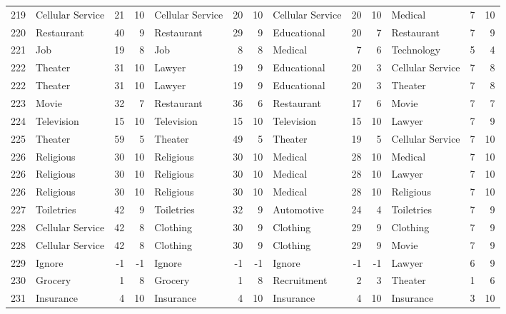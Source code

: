 \begin{figure}[htbp]
\begin{tabular}{rlrrlrrlrrlrr}
    219   & Cellular Service & 21    & 10    & Cellular Service & 20    & 10    & Cellular Service & 20    & 10    & Medical & 7     & 10 \\
    220   & Restaurant & 40    & 9     & Restaurant & 29    & 9     & Educational & 20    & 7     & Restaurant & 7     & 9 \\
    221   & Job   & 19    & 8     & Job   & 8     & 8     & Medical & 7     & 6     & Technology & 5     & 4 \\
    222   & Theater & 31    & 10    & Lawyer & 19    & 9     & Educational & 20    & 3     & Cellular Service & 7     & 8 \\
    222   & Theater & 31    & 10    & Lawyer & 19    & 9     & Educational & 20    & 3     & Theater & 7     & 8 \\
    223   & Movie & 32    & 7     & Restaurant & 36    & 6     & Restaurant & 17    & 6     & Movie & 7     & 7 \\
    224   & Television & 15    & 10    & Television & 15    & 10    & Television & 15    & 10    & Lawyer & 7     & 9 \\
    225   & Theater & 59    & 5     & Theater & 49    & 5     & Theater & 19    & 5     & Cellular Service & 7     & 10 \\
    226   & Religious & 30    & 10    & Religious & 30    & 10    & Medical & 28    & 10    & Medical & 7     & 10 \\
    226   & Religious & 30    & 10    & Religious & 30    & 10    & Medical & 28    & 10    & Lawyer & 7     & 10 \\
    226   & Religious & 30    & 10    & Religious & 30    & 10    & Medical & 28    & 10    & Religious & 7     & 10 \\
    227   & Toiletries & 42    & 9     & Toiletries & 32    & 9     & Automotive & 24    & 4     & Toiletries & 7     & 9 \\
    228   & Cellular Service & 42    & 8     & Clothing & 30    & 9     & Clothing & 29    & 9     & Clothing & 7     & 9 \\
    228   & Cellular Service & 42    & 8     & Clothing & 30    & 9     & Clothing & 29    & 9     & Movie & 7     & 9 \\
    229   & Ignore & -1    & -1    & Ignore & -1    & -1    & Ignore & -1    & -1    & Lawyer & 6     & 9 \\
    230   & Grocery & 1     & 8     & Grocery & 1     & 8     & Recruitment & 2     & 3     & Theater & 1     & 6 \\
    231   & Insurance & 4     & 10    & Insurance & 4     & 10    & Insurance & 4     & 10    & Insurance & 3     & 10 \\

\end{tabular}
\end{figure}

